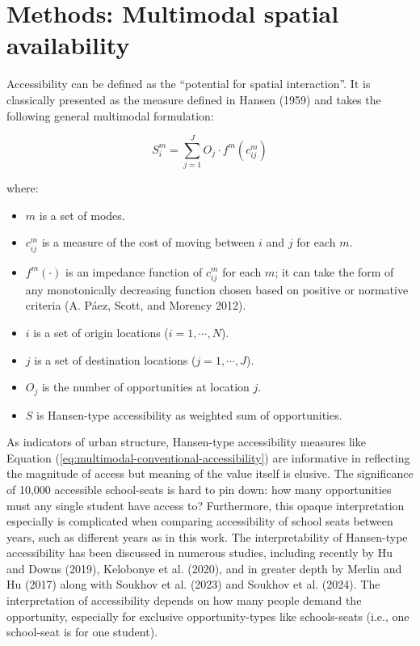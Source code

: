 \documentclass[
default
]{sn-jnl}
\providecommand{\tightlist}{%
  \setlength{\itemsep}{0pt}\setlength{\parskip}{0pt}}\usepackage{longtable,booktabs,array}
\begin{document}
\section{Methods: Multimodal spatial
availability}\label{methods-multimodal-spatial-availability}

Accessibility can be defined as the ``potential for spatial
interaction''. It is classically presented as the measure defined in
Hansen (1959) and takes the following general multimodal formulation:

\begin{equation}
\label{eq:multimodal-conventional-accessibility}
S_i^m = \sum_{j=1}^JO_j \cdot f^m(c_{ij}^m)
\end{equation}

\noindent where:

\begin{itemize}
\tightlist
\item
  \(m\) is a set of modes.
\item
  \(c_{ij}^m\) is a measure of the cost of moving between \(i\) and
  \(j\) for each \(m\).
\item
  \(f^m(\cdot)\) is an impedance function of \(c_{ij}^m\) for each
  \(m\); it can take the form of any monotonically decreasing function
  chosen based on positive or normative criteria (A. Páez, Scott, and
  Morency 2012).
\item
  \(i\) is a set of origin locations (\(i = 1,\cdots,N\)).
\item
  \(j\) is a set of destination locations (\(j = 1,\cdots,J\)).
\item
  \(O_j\) is the number of opportunities at location \(j\).
\item
  \(S\) is Hansen-type accessibility as weighted sum of opportunities.
\end{itemize}

As indicators of urban structure, Hansen-type accessibility measures
like Equation (\ref{eq:multimodal-conventional-accessibility}) are
informative in reflecting the magnitude of access but meaning of the
value itself is elusive. The significance of 10,000 accessible
school-seats is hard to pin down: how many opportunities must any single
student have access to? Furthermore, this opaque interpretation
especially is complicated when comparing accessibility of school seats
between years, such as different years as in this work. The
interpretability of Hansen-type accessibility has been discussed in
numerous studies, including recently by Hu and Downs (2019), Kelobonye
et al. (2020), and in greater depth by Merlin and Hu (2017) along with
Soukhov et al. (2023) and Soukhov et al. (2024). The interpretation of
accessibility depends on how many people demand the opportunity,
especially for exclusive opportunity-types like schools-seats (i.e., one
school-seat is for one student).
\end{document}

